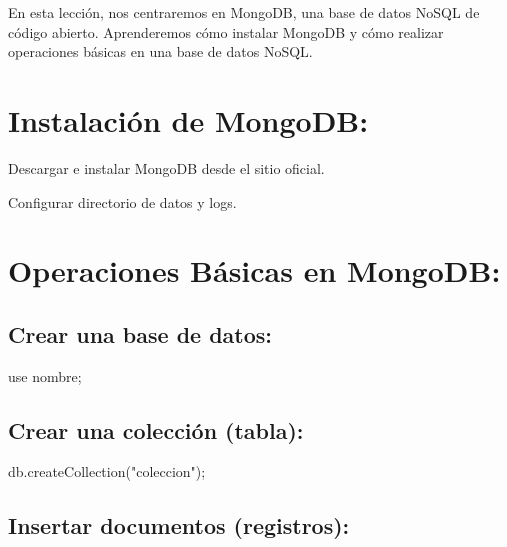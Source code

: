 \documentclass[
  a4paper,
  DIV=11,
  numbers=noendperiod,
  onepage,
  openany]{scrreprt}
\newenvironment{Shaded}{\begin{snugshade}}{\end{snugshade}}
\newcommand{\NormalTok}[1]{\textcolor[rgb]{0.00,0.23,0.31}{#1}}
\begin{document}
En esta lección, nos centraremos en MongoDB, una base de datos NoSQL de
código abierto. Aprenderemos cómo instalar MongoDB y cómo realizar
operaciones básicas en una base de datos NoSQL.

\hypertarget{instalaciuxf3n-de-mongodb}{%
\section{Instalación de MongoDB:}\label{instalaciuxf3n-de-mongodb}}

Descargar e instalar MongoDB desde el sitio oficial.

Configurar directorio de datos y logs.

\hypertarget{operaciones-buxe1sicas-en-mongodb}{%
\section{Operaciones Básicas en
MongoDB:}\label{operaciones-buxe1sicas-en-mongodb}}

\hypertarget{crear-una-base-de-datos-2}{%
\subsection{Crear una base de datos:}\label{crear-una-base-de-datos-2}}

\begin{Shaded}
\begin{Highlighting}[]
\NormalTok{use nombre;}
\end{Highlighting}
\end{Shaded}

\hypertarget{crear-una-colecciuxf3n-tabla}{%
\subsection{Crear una colección
(tabla):}\label{crear-una-colecciuxf3n-tabla}}

\begin{Shaded}
\begin{Highlighting}[]
\NormalTok{db.createCollection("coleccion");}
\end{Highlighting}
\end{Shaded}

\hypertarget{insertar-documentos-registros}{%
\subsection{Insertar documentos
(registros):}\label{insertar-documentos-registros}}
\end{document}
